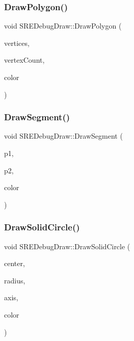 \hypertarget{class_s_r_e_debug_draw_a3aeb14dc08bb5c4d490e30cc62ad1787}{}\label{class_s_r_e_debug_draw_a3aeb14dc08bb5c4d490e30cc62ad1787} 
\subsubsection{\texorpdfstring{Draw\+Polygon()}{DrawPolygon()}}
{\footnotesize\ttfamily void S\+R\+E\+Debug\+Draw\+::\+Draw\+Polygon (\begin{DoxyParamCaption}\item[{const b2\+Vec2 $\ast$}]{vertices,  }\item[{int32}]{vertex\+Count,  }\item[{const b2\+Color \&}]{color }\end{DoxyParamCaption})}

\hypertarget{class_s_r_e_debug_draw_ae52016e6134930d09f6f8a07308cc9e7}{}\label{class_s_r_e_debug_draw_ae52016e6134930d09f6f8a07308cc9e7} 
\subsubsection{\texorpdfstring{Draw\+Segment()}{DrawSegment()}}
{\footnotesize\ttfamily void S\+R\+E\+Debug\+Draw\+::\+Draw\+Segment (\begin{DoxyParamCaption}\item[{const b2\+Vec2 \&}]{p1,  }\item[{const b2\+Vec2 \&}]{p2,  }\item[{const b2\+Color \&}]{color }\end{DoxyParamCaption})}

\hypertarget{class_s_r_e_debug_draw_a9392357bb882d28ca0a86f179901488b}{}\label{class_s_r_e_debug_draw_a9392357bb882d28ca0a86f179901488b} 
\subsubsection{\texorpdfstring{Draw\+Solid\+Circle()}{DrawSolidCircle()}}
{\footnotesize\ttfamily void S\+R\+E\+Debug\+Draw\+::\+Draw\+Solid\+Circle (\begin{DoxyParamCaption}\item[{const b2\+Vec2 \&}]{center,  }\item[{float32}]{radius,  }\item[{const b2\+Vec2 \&}]{axis,  }\item[{const b2\+Color \&}]{color }\end{DoxyParamCaption})}

